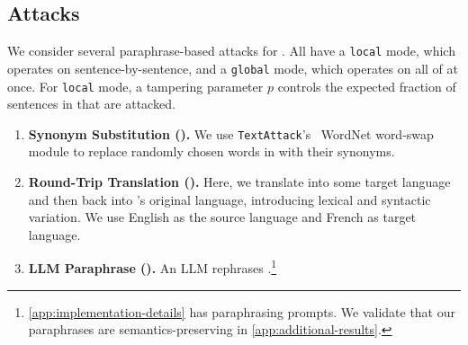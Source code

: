 \subsection{Attacks}
\label{subsec:attacks}
We consider several paraphrase-based attacks for \attack. All have a \texttt{local} mode, which operates on \stegotext sentence-by-sentence, and a \texttt{global} mode, which operates on all of \stegotext at once. For \texttt{local} mode, a tampering parameter $p$ controls the expected fraction of sentences in \stegotext that are attacked.
\begin{enumerate}[itemsep=0pt, parsep=1pt]
\item \textbf{Synonym Substitution (\syn).} We use \texttt{TextAttack}'s~\cite{morris2020textattack} WordNet word-swap module to replace randomly chosen words in \stegotext with their synonyms.
\item \textbf{Round-Trip Translation (\rtt).} Here, we translate \stegotext into some target language and then back into \stegotext's original language, introducing lexical and syntactic variation. We use English as the source language and French as target language.
\item \textbf{LLM Paraphrase (\llmp).} An LLM rephrases \stegotext.\footnote{\autoref{app:implementation-details} has paraphrasing prompts. We validate that our paraphrases are semantics-preserving in \autoref{app:additional-results}.}
\end{enumerate}


